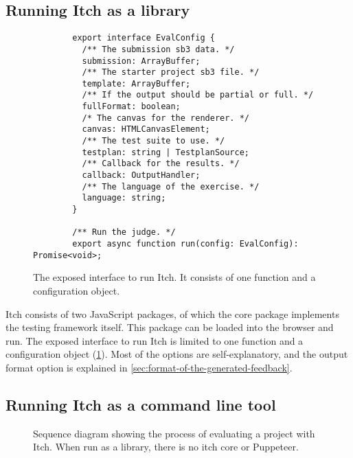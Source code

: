 \documentclass[../main]{subfiles}
\begin{document}
\subsection{Running Itch as a library}\label{subsec:running-itch-as-a-library}

\begin{figure}
    \begin{verbatim}
        export interface EvalConfig {
          /** The submission sb3 data. */
          submission: ArrayBuffer;
          /** The starter project sb3 file. */
          template: ArrayBuffer;
          /** If the output should be partial or full. */
          fullFormat: boolean;
          /* The canvas for the renderer. */
          canvas: HTMLCanvasElement;
          /** The test suite to use. */
          testplan: string | TestplanSource;
          /** Callback for the results. */
          callback: OutputHandler;
          /** The language of the exercise. */
          language: string;
        }

        /** Run the judge. */
        export async function run(config: EvalConfig): Promise<void>;
    \end{verbatim}
    \caption{The exposed interface to run Itch. It consists of one function and a configuration object.}\label{fig:itch-library-interface}
\end{figure}

Itch consists of two JavaScript packages, of which the core package implements the testing framework itself.
This package can be loaded into the browser and run.
The exposed interface to run Itch is limited to one function and a configuration object (\cref{fig:itch-library-interface}).
Most of the options are self-explanatory, and the output format option is explained in \cref{sec:format-of-the-generated-feedback}.

\subsection{Running Itch as a command line tool}\label{subsec:running-itch-as-a-command-line-tool}

\begin{figure}
    \begin{wide}
        
    \end{wide}
    \caption{Sequence diagram showing the process of evaluating a project with Itch. When run as a library, there is no itch core or Puppeteer.}\label{fig:itch-sequence-diagram}
\end{figure}
\end{document}
